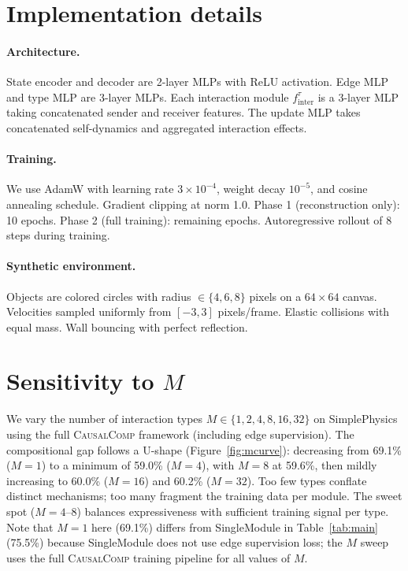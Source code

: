 \documentclass{article}
\newcommand{\ours}{\textsc{CausalComp}}
\begin{document}



\appendix

\section{Implementation details}
\label{app:impl}

\paragraph{Architecture.} State encoder and decoder are 2-layer MLPs with ReLU activation. Edge MLP and type MLP are 3-layer MLPs. Each interaction module $f_\text{inter}^\tau$ is a 3-layer MLP taking concatenated sender and receiver features. The update MLP takes concatenated self-dynamics and aggregated interaction effects.

\paragraph{Training.} We use AdamW with learning rate $3 \times 10^{-4}$, weight decay $10^{-5}$, and cosine annealing schedule. Gradient clipping at norm 1.0. Phase 1 (reconstruction only): 10 epochs. Phase 2 (full training): remaining epochs. Autoregressive rollout of 8 steps during training.

\paragraph{Synthetic environment.} Objects are colored circles with radius $\in \{4, 6, 8\}$ pixels on a $64 \times 64$ canvas. Velocities sampled uniformly from $[-3, 3]$ pixels/frame. Elastic collisions with equal mass. Wall bouncing with perfect reflection.

\section{Sensitivity to $M$}
\label{sec:m_curve}

We vary the number of interaction types $M \in \{1, 2, 4, 8, 16, 32\}$ on SimplePhysics using the full \ours{} framework (including edge supervision). The compositional gap follows a U-shape (Figure~\ref{fig:mcurve}): decreasing from 69.1\% ($M{=}1$) to a minimum of 59.0\% ($M{=}4$), with $M{=}8$ at 59.6\%, then mildly increasing to 60.0\% ($M{=}16$) and 60.2\% ($M{=}32$). Too few types conflate distinct mechanisms; too many fragment the training data per module. The sweet spot ($M{=}4$--$8$) balances expressiveness with sufficient training signal per type. Note that $M{=}1$ here (69.1\%) differs from SingleModule in Table~\ref{tab:main} (75.5\%) because SingleModule does not use edge supervision loss; the $M$ sweep uses the full \ours{} training pipeline for all values of $M$.
\end{document}
